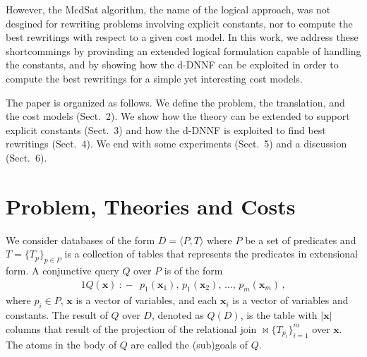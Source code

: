 \documentclass{sig-alternate}
\newcommand{\tup}[1]{\langle #1 \rangle}
\newcommand{\vvec}[1]{\mathbf{#1}}
\newcommand{\join}{\bowtie}
\newcommand{\qrule}{:\!\!-}
\begin{document}
However, the McdSat algorithm, the name of the logical approach,
was not desgined for rewriting problems involving explicit constants,
nor to compute the best rewritings with respect to a given cost model.
In this work, we address these shortcommings by provinding an
extended logical formulation capable of handling the constants,
and by showing how the d-DNNF can be exploited in order to compute
the best rewritings for a simple yet interesting cost models.

The paper is organized as follows.
We define the problem, the translation, and the cost models (Sect.~2).
We show how the theory can be extended to support explicit constants (Sect.~3)
and how the d-DNNF is exploited to find best rewritings (Sect.~4).
We end with some experiments (Sect.~5) and a discussion (Sect.~6).

\section{Problem, Theories and Costs}

We consider databases of the form $D=\tup{P,T}$ where
$P$ be a set of predicates and $T=\{T_p\}_{p\in P}$ is a collection
of tables that represents the predicates in extensional form.
A conjunctive query $Q$ over $P$ is of the form 
\begin{alignat*}{1}
Q(\vvec{x})\ \qrule\ \  p_1(\vvec{x}_1),\, p_1(\vvec{x}_2),\, \ldots,\, p_m(\vvec{x}_m)\,,
\end{alignat*}
where $p_i\in P$, $\vvec{x}$ is a vector of variables, and each
$\vvec{x}_i$ is a vector of variables and constants.
The result of $Q$ over $D$, denoted as $Q(D)$, is the table with
$|\vvec{x}|$ columns that result of the projection of the relational
join $\join\!\!\{T_{p_i}\}_{i=1}^m$ over $\vvec{x}$.
The atoms in the body of $Q$ are called the (sub)goals of $Q$.
\end{document}
